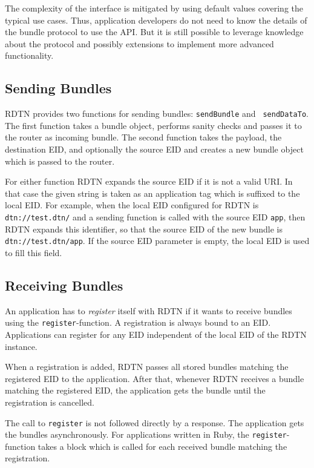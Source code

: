 \documentclass{article}
\begin{document}
The complexity of the interface is mitigated by using default values covering the
typical use cases. Thus, application developers do not need to know the details
of the bundle protocol to use the API. But it is still possible to leverage
knowledge about the protocol and possibly extensions to implement more advanced
functionality.

\subsection{Sending Bundles}\label{sec.sending}

RDTN provides two functions for sending bundles: {\tt sendBundle} and {\tt
sendDataTo}. The first function takes a bundle object, performs sanity checks
and passes it to the router as incoming bundle. The second function takes the
payload, the destination EID, and optionally the source EID and creates a new
bundle object which is passed to the router.

For either function RDTN expands the source EID if it is not a valid URI. In
that case the given string is taken as an application tag which is suffixed to
the local EID. For example, when the local EID configured for RDTN is {\tt
dtn://test.dtn/} and a sending function is called with the source EID {\tt app},
then RDTN expands this identifier, so that the source EID of the new bundle is
{\tt dtn://test.dtn/app}. If the source EID parameter is empty, the local EID is
used to fill this field.

\subsection{Receiving Bundles}\label{sec.receiving}

An application has to {\em register} itself with RDTN if it wants to receive bundles using
the {\tt register}-function. A registration is always bound to an EID.
Applications can register for any EID independent of the local EID of the RDTN
instance.

When a registration is added, RDTN passes all stored bundles matching the
registered EID to the application. After that, whenever RDTN receives a bundle 
matching the registered EID, the application gets the bundle until the 
registration is cancelled.

The call to {\tt register} is not followed directly by a response. The
application gets the bundles asynchronously. For applications written in Ruby,
the {\tt register}-function takes a block which is called for each received
bundle matching the registration.
\end{document}
